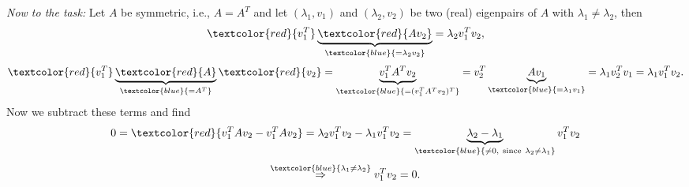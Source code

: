 {\begin{enumerate}
	\textit{Now to the task:} Let $A$ be symmetric, i.e., $A=A^T$ and let $(\lambda_1,v_1)$ and $(\lambda_2,v_2)$ be two (real) eigenpairs of $A$ with $\lambda_1\neq\lambda_2$, then
	$$
	\textcolor{red}{v_1^T}\underbrace{\textcolor{red}{Av_2}}_{\textcolor{blue}{=\lambda_2v_2}} = \lambda_2v_1^Tv_2,
	$$ 
	$$ \textcolor{red}{v_1^T}\underbrace{\textcolor{red}{A}}_{\textcolor{blue}{=A^T}}\textcolor{red}{v_2} = \underbrace{v_1^TA^Tv_2}_{\textcolor{blue}{=(v_1^TA^Tv_2)^T}} = v_2^T\underbrace{Av_1}_{\textcolor{blue}{=\lambda_1v_1}} = \lambda_1v_2^Tv_1 = \lambda_1v_1^Tv_2. 
	$$
	Now we subtract these terms and find 
	$$
	0=\textcolor{red}{v_1^TAv_2-v_1^TAv_2} = \lambda_2v_1^Tv_2 - \lambda_1v_1^Tv_2 = \underbrace{\lambda_2-\lambda_1}_{\textcolor{blue}{\neq 0,\  \text{since}\ \lambda_2\neq\lambda_1}}v_1^Tv_2
	$$
	$$
	\stackrel{\textcolor{blue}{\lambda_1\neq\lambda_2}}{\Rightarrow} v_1^Tv_2 = 0.
	$$
\end{enumerate}


}